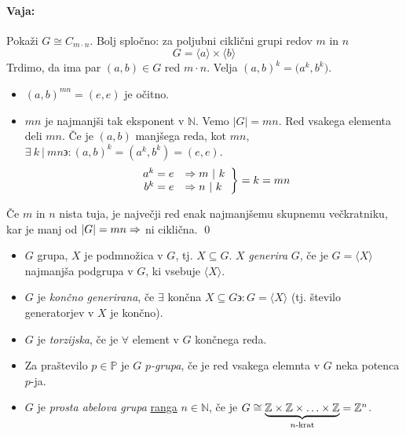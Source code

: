 \begin{enumerate}
{		\paragraph{Vaja:} Poka\v zi $G \cong C_{m \cdot n}$. Bolj splo\v cno: za poljubni cikli\v cni grupi redov $m$ in $n$
		\[
			G = \langle a \rangle \times \langle b \rangle
		\]
		\ni Trdimo, da ima par $(a, b) \in G$ red $m \cdot n$. Velja $(a,b)^k = \big(a^k, b^k\big)$.
		\begin{itemize}
			\item{$(a, b)^{mn} = (e, e)$ je o\v citno.}
			\item{$mn$ je najmanj\v si tak eksponent v $\mathbb{N}$. Vemo $|G| = mn$. Red vsakega elementa deli $mn$. \v Ce je
				$(a, b)$ manj\v sega reda, kot $mn$, $\exists\ k\ |\ mn \backepsilon: (a,b)^k = (a^k, b^k) = (e, e)$.
				\[
					\left .
					\begin{array}{rl}
						a^k = e &\Rightarrow m\ |\ k \\
						b^k = e &\Rightarrow n\ |\ k
					\end{array}\right\} = k = mn
				\]}
		\end{itemize}
		\v Ce $m$ in $n$ nista tuja, je najve\v cji red enak najmanj\v semu skupnemu ve\v ckratniku, kar je manj od $|G| = mn \Rightarrow$ ni cikli\v cna.
		\qed
	}
\end{enumerate}

\begin{defin}
	\begin{itemize}
		\item{$G$ grupa, $X$ je podmno\v zica v $G$, tj. $X \subseteq G$. $X$ \emph{generira} $G$, \v ce je $G = \langle X \rangle$ najmanj\v sa podgrupa
			v $G$, ki vsebuje $\langle X \rangle$.}
		\item{$G$ je \emph{kon\v cno generirana}, \v ce $\exists$ kon\v cna $X \subseteq G \backepsilon: G = \langle X \rangle$ (tj. \v stevilo generatorjev v $X$ je
			kon\v cno).}
		\item{$G$ je \emph{torzijska}, \v ce je $\forall$ element v $G$ kon\v cnega reda.}
		\item{Za pra\v stevilo $p \in \mathbb{P}$ je $G$ \emph{$p$-grupa}, \v ce je red vsakega elemnta v $G$ neka potenca $p$-ja.}
		\item{$G$ je \emph{prosta abelova grupa} \underline{ranga} $n \in \mathbb{N}$, \v ce je $G \cong \underbrace{\mathbb{Z} \times \mathbb{Z} \times \ldots \times \mathbb{Z}}_\text{$n$-krat} = \mathbb{Z}^n$.}
	\end{itemize}
\end{defin}

